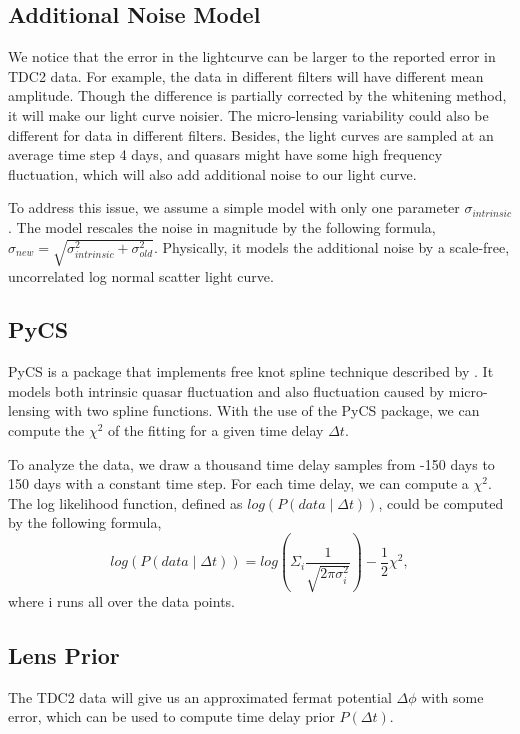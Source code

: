 \documentclass[\docopts]{\docclass}
\begin{document}
\subsection{Additional Noise Model}
We notice that the error in the lightcurve can be larger to the reported error in TDC2 data. For example, the data in different filters will have different mean amplitude. Though the difference is partially corrected by the whitening method, it will make our light curve noisier. The micro-lensing variability could also be different for data in different filters. Besides, the light curves are sampled at an average time step 4 days, and quasars might have some high frequency fluctuation, which will also add additional noise to our light curve.

To address this issue, we assume a simple model with only one parameter $\sigma_{intrinsic}$. The model rescales the noise in magnitude by the following formula, $\sigma_{new}=\sqrt{\sigma_{intrinsic}^2+\sigma_{old}^2}$.  Physically, it models the additional noise by a scale-free, uncorrelated log normal scatter light curve.

\subsection{PyCS}
PyCS is a package that implements free knot spline technique described by \cite{2013A&A...553A.120T}. It models both intrinsic quasar fluctuation and also fluctuation caused by micro-lensing with two spline functions. With the use of the PyCS package, we can compute the $\chi^2$ of the fitting for a given time delay $\Delta t$.

To analyze the data, we draw  a thousand time delay samples from -150 days to 150 days with a constant time step. For each time delay, we can compute a $\chi^2$. The log likelihood function, defined as $log(P(data \mid \Delta t))$, could be computed by the following formula,
\begin{equation}
log(P(data \mid \Delta t))  = log (\Sigma_i  \frac{1}{\sqrt{2 \pi \sigma_i^2}} ) -\frac{1}{2} \chi^2,
\end{equation}
where i runs all over the data points.

\subsection{Lens Prior}
The TDC2 data will give us an approximated fermat potential $\Delta \phi$ with some error, which can be used to compute time delay prior $P(\Delta t)$.
\end{document}
